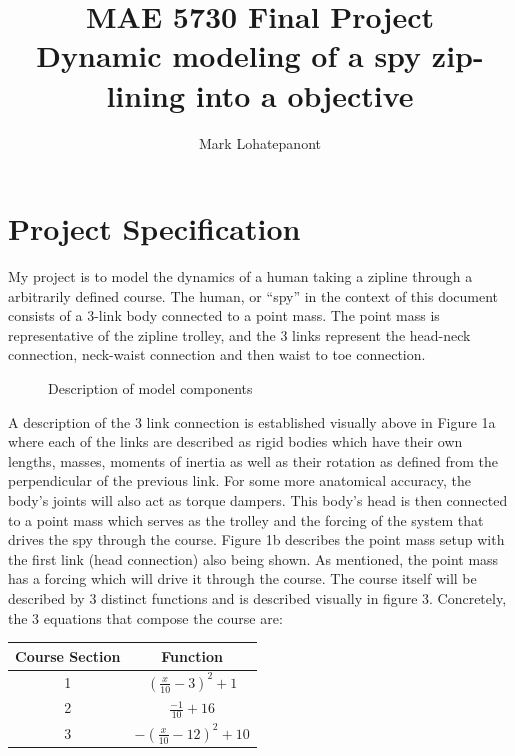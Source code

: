 \documentclass{article}
\title{MAE 5730 Final Project \\
\large{Dynamic modeling of a spy zip-lining into a objective}}
\author{Mark Lohatepanont}
\begin{document}
\maketitle
\tableofcontents
\newpage
\section{Project Specification}
My project is to model the dynamics of a human taking a zipline through a arbitrarily defined course. The human, or “spy” in the context of this document consists of a 3-link body connected to a point mass. The point mass is representative of the zipline trolley, and the 3 links represent the head-neck connection, neck-waist connection and then waist to toe connection. \\

        
\begin{figure}[h]
    \centering
	\qquad
	\caption{Description of model components}%
	\label{fig:example}%
\end{figure}

A description of the 3 link connection is established visually above in Figure 1a where each of the links are described as rigid bodies which have their own lengths, masses, moments of inertia as well as their rotation as defined from the perpendicular of the previous link. For some more anatomical accuracy, the body’s joints will also act as torque dampers. 
This body’s head is then connected to a point mass which serves as the trolley and the forcing of the system that drives the spy through the course. 
Figure 1b describes the point mass setup with the first link (head connection) also being shown. As mentioned, the point mass has a forcing which will drive it through the course.
The course itself will be described by 3 distinct functions and is described visually in figure 3. Concretely, the 3 equations that compose the course are:
\begin{center}
	\begin{tabular}{c|c}
		Course Section & Function\\
		\hline
		1&$(\frac{x}{10}-3)^2+1$\\
		2&$\frac{-1}{10}+16$\\
		3&$-(\frac{x}{10}-12)^2+10$
	\end{tabular}
\end{center}
\end{document}
